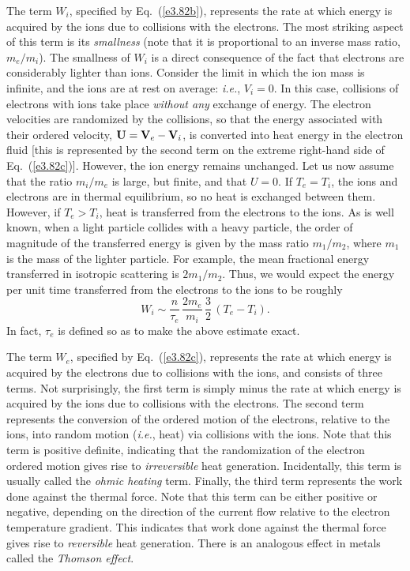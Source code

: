 The term $W_i$, specified by Eq.~(\ref{e3.82b}),  represents the rate at which
energy is acquired by the ions due to collisions
with the electrons. 
The most striking aspect of this term is
its {\em smallness}\/
 (note that it is proportional to an inverse mass ratio,
$m_e/m_i$). The smallness of $W_i$ is a direct consequence of the
fact that electrons are considerably lighter than ions. Consider the
limit in which the ion mass is infinite, and the ions are at rest on average:
{\em i.e.}, $V_i=0$. In this case, collisions of electrons with ions
take place {\em without any}\/ exchange of energy. The electron velocities
are randomized by the collisions, so that the energy associated
with their ordered velocity, ${\bf U} = {\bf V}_e-{\bf V}_i$, is converted
into heat energy in the electron fluid [this is represented by the second term
on the extreme right-hand side of Eq.~(\ref{e3.82c})]. However, the ion energy remains
unchanged. Let us now assume that the ratio $m_i/m_e$ is large, but finite, and
that $U=0$. If $T_e=T_i$, the ions and electrons are in thermal equilibrium, so
no heat is exchanged between them. However, if $T_e>T_i$, heat
is transferred from the electrons to the ions. As is well known, when
a light particle collides with a heavy particle, the order of magnitude of the
transferred energy is given by the mass ratio $m_1/m_2$, where $m_1$ is the
mass of the lighter particle. For example, the mean fractional energy transferred
in isotropic scattering is $2m_1/m_2$. Thus, we would expect the
energy per unit time transferred from  the electrons to the ions to be roughly
\begin{equation}
W_i \sim \frac{n}{\tau_e} \,\frac{2m_e}{m_i}\,\frac{3}{2} \,(T_e-T_i).
\end{equation}
In fact, $\tau_e$ is defined so as to make the above estimate exact.

The term $W_e$, specified by Eq.~(\ref{e3.82c}), represents the rate at
which energy is acquired by the electrons due to
collisions with the ions, and consists of three terms. Not surprisingly,
the first term is simply minus the rate at which energy is
acquired by the ions due to collisions with the
electrons. The second term represents the conversion
of the ordered motion of the electrons, relative to the ions, into random
motion ({\em i.e.}, heat) via collisions with the ions. Note that this
term is positive definite, indicating that the randomization of the electron
ordered motion gives rise to {\em irreversible}\/ heat generation.
Incidentally,  this
term is usually called the {\em ohmic heating}\/ term. Finally, the third
term represents the work done against the thermal force. Note that this
term can be either positive or negative, depending on the direction of
the current flow relative to the electron temperature gradient. This
indicates that work done against the thermal force gives rise to {\em reversible}\/ 
heat generation. There is an analogous effect in metals called the {\em
Thomson effect}. 

